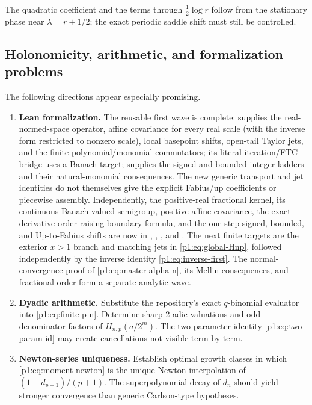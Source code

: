 \documentclass[11pt,oneside]{article}
\theoremstyle{definition}
\theoremstyle{remark}
\newcommand{\1}{\mathbf 1}
\begin{document}
The quadratic coefficient and the terms through \(\frac12\log r\) follow from
the stationary phase near \(\lambda=r+1/2\); the exact periodic saddle shift
must still be controlled.

\subsection{Holonomicity, arithmetic, and formalization problems}
The following directions appear especially promising.
\begin{enumerate}
\item \textbf{Lean formalization.}  The reusable first wave is complete:
 supplies the real-normed-space operator,
affine covariance for every real scale (with the inverse form restricted to
nonzero scale), local basepoint shifts, open-tail Taylor jets, and the finite
polynomial/monomial commutators; its literal-iteration/FTC bridge uses a Banach target;
 supplies the signed and bounded
integer ladders and their natural-monomial consequences.  The new generic
transport and jet identities do not themselves give the explicit Fabius/up
coefficients or piecewise assembly.  Independently, the positive-real fractional kernel,
its continuous Banach-valued semigroup, positive affine covariance, the exact derivative
order-raising boundary formula, and the one-step signed, bounded, and Up-to-Fabius shifts
are now in , ,
, and .  The next
finite targets are the exterior
\(x>1\) branch and matching jets in
\eqref{p1:eq:global-Hnp}, followed independently by the inverse identity
\eqref{p1:eq:inverse-first}.  The normal-convergence proof of
\eqref{p1:eq:master-alpha-n}, its Mellin consequences, and fractional order form
a separate analytic wave.

\item \textbf{Dyadic arithmetic.}  Substitute the repository's exact
\(q\)-binomial evaluator into \eqref{p1:eq:finite-p-n}.  Determine sharp
2-adic valuations and odd denominator factors of
\(H_{n,p}(a/2^m)\).  The two-parameter identity
\eqref{p1:eq:two-param-id} may create cancellations not visible term by term.

\item \textbf{Newton-series uniqueness.}  Establish optimal growth classes in
which \eqref{p1:eq:moment-newton} is the unique Newton interpolation of
\((1-d_{p+1})/(p+1)\).  The superpolynomial decay of \(d_n\) should yield
stronger convergence than generic Carlson-type hypotheses.


\end{enumerate}
\end{document}
